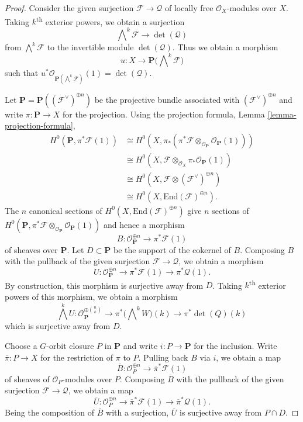 \begin{proof}
Consider the given surjection $\mathcal{F} \to \mathcal{Q}$ of locally free
$\mathcal{O}_X$-modules over $X$.
Taking $k$\textsuperscript{th} exterior powers, we obtain a surjection
$$
  \bigwedge\nolimits^k \mathcal{F} \to \det(\mathcal{Q})
$$
from $\bigwedge^k\mathcal{F}$ to the invertible module $\det(\mathcal{Q})$.
Thus we obtain a morphism
$$
  u : X \to \mathbf{P}\big(\bigwedge\nolimits^k \mathcal{F}\big)
$$
such that
$u^*\mathcal{O}_{\mathbf{P}(\bigwedge^k\mathcal{F})}(1) = \det(\mathcal{Q})$.

Let $\mathbf{P} = \mathbf{P}((\mathcal{F}^\vee)^{\oplus n})$ be the projective
bundle associated with $(\mathcal{F}^\vee)^{\oplus n}$ and write
$\pi : \mathbf{P} \to X$ for the projection.
Using the projection formula, Lemma \ref{lemma-projection-formula},
\begin{align*}
H^0(\mathbf{P}, \pi^*\mathcal{F}(1))
  & \cong
H^0(X, \pi_*(\pi^*\mathcal{F} \otimes_{\mathcal{O}_{\mathbf{P}}}
  \mathcal{O}_{\mathbf{P}}(1))) \\
  & \cong
H^0(X,\mathcal{F} \otimes_{\mathcal{O}_X} \pi_*\mathcal{O}_{\mathbf{P}}(1)) \\
  & \cong
H^0(X,\mathcal{F} \otimes (\mathcal{F}^\vee)^{\oplus n}) \\
  & \cong
H^0(X,\mathrm{End}(\mathcal{F})^{\oplus n}).
\end{align*}
The $n$ canonical sections of $H^0(X,\mathrm{End}(\mathcal{F})^{\oplus n})$
give $n$ sections of
$H^0(\mathbf{P}, \pi^*\mathcal{F}
  \otimes_{\mathcal{O}_{\mathbf{P}}} \mathcal{O}_{\mathbf{P}}(1))$ and hence
a morphism
$$
  B : \mathcal{O}_{\mathbf{P}}^{\oplus n} \to \pi^*\mathcal{F}(1)
$$
of sheaves over $\mathbf{P}$.
Let $D \subset \mathbf{P}$ be the support of the cokernel of $B$.
Composing $B$ with the pullback of the given surjection
$\mathcal{F} \to \mathcal{Q}$, we obtain a morphism
$$
  U : \mathcal{O}_{\mathbf{P}}^{\oplus n} \to
        \pi^*\mathcal{F}(1) \to
        \pi^*\mathcal{Q}(1).
$$
By construction, this morphism is surjective away from $D$.
Taking $k$\textsuperscript{th} exterior powers of this morphism, we obtain a
morphism
$$
  \bigwedge^k U : \mathcal{O}_{\mathbf{P}}^{\oplus \binom{n}{k}} \to
    \pi^*\big(\bigwedge\nolimits^k W\big)(k) \to
    \pi^*\det(Q)(k)
$$
which is surjective away from $D$.

Choose a $G$-orbit closure $P$ in $\mathbf{P}$ and write $i : P \to \mathbf{P}$
for the inclusion.
Write $\overline{\pi} : P \to X$ for the restriction of $\pi$ to $P$.
Pulling back $B$ via $i$, we obtain a map
$$
  \overline{B} : \mathcal{O}_P^{\oplus n} \to \overline{\pi}^* \mathcal{F}(1)
$$
of sheaves of $\mathcal{O}_P$-modules over $P$.
Composing $\overline{B}$ with the pullback of the given surjection
$\mathcal{F} \to \mathcal{Q}$, we obtain a map
$$
  \overline{U} : \mathcal{O}_P^{\oplus n} \to
                  \overline{\pi}^*\mathcal{F}(1) \to
                  \overline{\pi}^*\mathcal{Q}(1).
$$
Being the composition of $\overline{B}$ with a surjection, $\overline{U}$ is
surjective away from $P \cap D$.
\end{proof}

